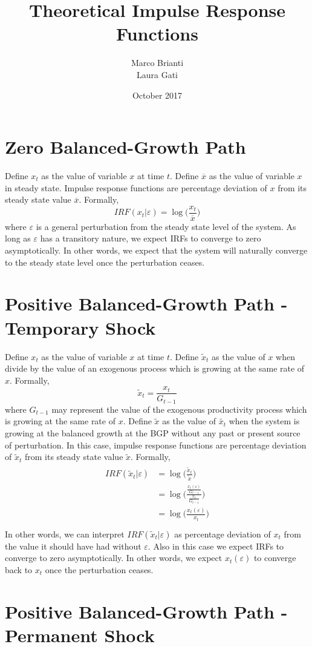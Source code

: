 \documentclass{article}
\title{Theoretical Impulse Response Functions}
\author{Marco Brianti\\Laura Gati}
\date{October 2017}
\begin{document}
	
	\maketitle
	
	\section{Zero Balanced-Growth Path}
	
	Define $x_t$ as the value of variable $x$ at time $t$. Define $\overline{x}$ as the value of variable $x$ in steady state. Impulse response functions are percentage deviation of $x$ from its steady state value $\overline{x}$. Formally,
$$
IRF(x_t | \varepsilon) = \log \bigg( \frac{x_t}{\overline{x}}  \bigg)
$$
where $\varepsilon$ is a general perturbation from the steady state level of the system. As long as $\varepsilon$ has a transitory nature, we expect IRFs to converge to zero asymptotically. In other words, we expect that the system will naturally converge to the steady state level once the perturbation ceases.
	
\section{Positive Balanced-Growth Path - Temporary Shock}

Define $x_t$ as the value of variable $x$ at time $t$. Define $\tilde{x}_t$ as the value of $x$ when divide by the value of an exogenous process which is growing at the same rate of $x$. Formally,
$$
\tilde{x}_t = \frac{x_t}{G_{t-1}}
$$
where $G_{t-1}$ may represent the value of the exogenous productivity process which is growing at the same rate of $x$. Define $\tilde{x}$ as the value of $\tilde{x_t}$ when the system is growing at the balanced growth at the BGP without any past or present source of perturbation. In this case, impulse response functions are percentage deviation of $\tilde{x}_t$ from its steady state value $\tilde{x}$. Formally,
\begin{eqnarray}
\begin{aligned}
IRF(\tilde{x}_t | \varepsilon) &= \log \bigg( \frac{\tilde{x}_t}{\tilde{x}}  \bigg)  \\
                               &= \log \bigg( \frac{\frac{x_t(\varepsilon)}{G_{t-1}}}{\frac{x_t}{G_{t-1}}}  \bigg)  \\
                               &= \log \bigg( \frac{x_t(\varepsilon)}{x_t} \bigg)  \\
\end{aligned}
\end{eqnarray}
In other words, we can interpret $IRF(\tilde{x}_t | \varepsilon)$ as percentage deviation of $x_t$ from the value it should have had without $\varepsilon$. Also in this case we expect IRFs to converge to zero asymptotically. In other words, we expect $x_t(\varepsilon)$ to converge back to $x_t$ once the perturbation ceases.

\section{Positive Balanced-Growth Path - Permanent Shock}
	
\end{document}
